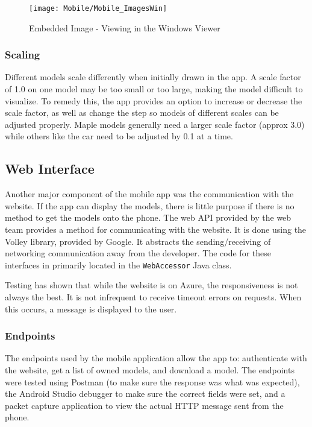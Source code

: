             \begin{figure}[H]
                \texttt{[image: Mobile/Mobile\_ImagesWin]}
                \centering
                \caption{Embedded Image - Viewing in the Windows Viewer}
                \label{fig:mobileEmbeddedWindows}
            \end{figure}

        \subsubsection{Scaling}

            Different models scale differently when initially drawn in the app. A scale factor of 1.0 on one model may be too small or too large, making the model difficult to visualize. To remedy this, the app provides an option to increase or decrease the scale factor, as well as change the step so models of different scales can be adjusted properly. Maple models generally need a larger scale factor (approx 3.0) while others like the car need to be adjusted by 0.1 at a time.
        
    \subsection{Web Interface}

        Another major component of the mobile app was the communication with the website.  If the app can display the models, there is little purpose if there is no method to get the models onto the phone.  The web API provided by the web team provides a method for communicating with the website.  It is done using the Volley library, provided by Google.  It abstracts the sending/receiving of networking communication away from the developer.  The code for these interfaces in primarily located in the \texttt{WebAccessor} Java class.

        Testing has shown that while the website is on Azure, the responsiveness is not always the best.  It is not infrequent to receive timeout errors on requests.  When this occurs, a message is displayed to the user.
        
        \subsubsection{Endpoints}\label{sec:Mobile_Auth}
        
            The endpoints used by the mobile application allow the app to: authenticate with the website, get a list of owned models, and download a model.  The endpoints were tested using Postman (to make sure the response was what was expected), the Android Studio debugger to make sure the correct fields were set, and a packet capture application to view the actual HTTP message sent from the phone.

